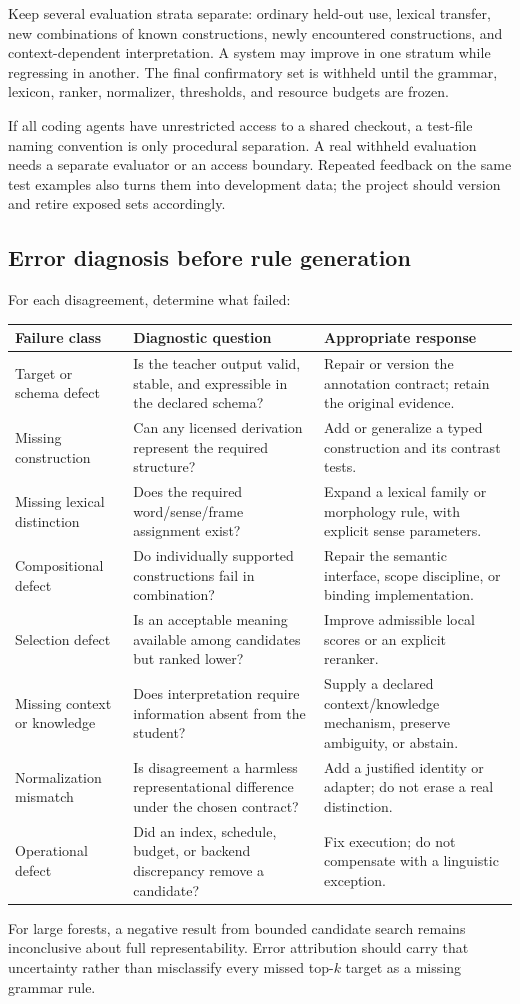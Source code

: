 \documentclass[11pt,a4paper]{article}
\begin{document}
Keep several evaluation strata separate: ordinary held-out use, lexical
transfer, new combinations of known constructions, newly encountered
constructions, and context-dependent interpretation. A system may improve in
one stratum while regressing in another. The final confirmatory set is
withheld until the grammar, lexicon, ranker, normalizer, thresholds, and
resource budgets are frozen.

If all coding agents have unrestricted access to a shared checkout, a
test-file naming convention is only procedural separation. A real withheld
evaluation needs a separate evaluator or an access boundary. Repeated
feedback on the same test examples also turns them into development data;
the project should version and retire exposed sets accordingly.

\subsection{Error diagnosis before rule generation}
For each disagreement, determine what failed:
\begin{longtable}{L{36mm}L{51mm}L{61mm}}
\toprule
Failure class & Diagnostic question & Appropriate response \\
\midrule
\endhead
Target or schema defect &
Is the teacher output valid, stable, and expressible in the declared schema? &
Repair or version the annotation contract; retain the original evidence. \\
Missing construction &
Can any licensed derivation represent the required structure? &
Add or generalize a typed construction and its contrast tests. \\
Missing lexical distinction &
Does the required word/sense/frame assignment exist? &
Expand a lexical family or morphology rule, with explicit sense parameters. \\
Compositional defect &
Do individually supported constructions fail in combination? &
Repair the semantic interface, scope discipline, or binding implementation. \\
Selection defect &
Is an acceptable meaning available among candidates but ranked lower? &
Improve admissible local scores or an explicit reranker. \\
Missing context or knowledge &
Does interpretation require information absent from the student? &
Supply a declared context/knowledge mechanism, preserve ambiguity, or abstain. \\
Normalization mismatch &
Is disagreement a harmless representational difference under the chosen contract? &
Add a justified identity or adapter; do not erase a real distinction. \\
Operational defect &
Did an index, schedule, budget, or backend discrepancy remove a candidate? &
Fix execution; do not compensate with a linguistic exception. \\
\bottomrule
\end{longtable}
For large forests, a negative result from bounded candidate search remains
inconclusive about full representability. Error attribution should carry that
uncertainty rather than misclassify every missed top-\(k\) target as a
missing grammar rule.
\end{document}
